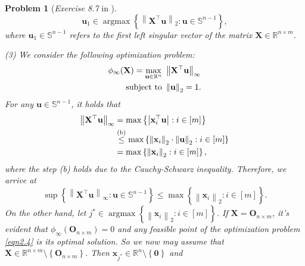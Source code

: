 \documentclass[11pt]{article}
\newtheorem{problem}{Problem}
\DeclareMathOperator*{\argmax}{argmax}
\numberwithin{equation}{problem}
\begin{document}
\begin{problem} [\emph{Exercise 8.7} in \cite{calafiore2014optimization}]
{\begin{equation*}
    \mathbf{u}_1 \in \argmax \left\{ \left\| \mathbf{X}^{\top} \mathbf{u} \right\|_2 : \mathbf{u} \in \mathbb{S}^{n-1} \right\},
\end{equation*}
where $\mathbf{u}_1 \in \mathbb{S}^{n-1}$ refers to the first left singular vector of the matrix $\mathbf{X} \in \mathbb{R}^{n \times m}$.
\medskip

\indent (3) We consider the following optimization problem:
\begin{equation}
    \label{eqn2.4}
    \begin{split}
        \phi_{\infty} (\mathbf{X}) = \max_{\mathbf{u} \in \mathbb{R}^n} \ & \left\| \mathbf{X}^{\top} \mathbf{u} \right\|_{\infty} \\
        \textnormal{subject to }& \left\| \mathbf{u} \right\|_2 = 1.
    \end{split}
\end{equation}
For any $\mathbf{u} \in \mathbb{S}^{n-1}$, it holds that
\begin{equation*}
    \begin{split}
        \left\| \mathbf{X}^{\top} \mathbf{u} \right\|_{\infty}
        &= \max \left\{ \left| \mathbf{x}_{i}^{\top} \mathbf{u} \right| : i \in [m] \right\} \\
        &\stackrel{\textnormal{(b)}}{\leq} \max \left\{ \left\| \mathbf{x}_{i} \right\|_{2} \cdot \left\| \mathbf{u} \right\|_2 : i \in [m] \right\} \\
        &= \max \left\{ \left\| \mathbf{x}_{i} \right\|_{2} : i \in [m] \right\},
    \end{split}
\end{equation*}
where the step (b) holds due to the Cauchy-Schwarz inequality. Therefore, we arrive at
\begin{equation}
    \label{eqn2.5}
    \sup \left\{ \left\| \mathbf{X}^{\top} \mathbf{u} \right\|_{\infty} : \mathbf{u} \in \mathbb{S}^{n-1} \right\} \leq \max \left\{ \left\| \mathbf{x}_{i} \right\|_{2} : i \in [m] \right\}.
\end{equation}
\indent On the other hand, let $j^* \in \argmax \left\{ \left\| \mathbf{x}_i \right\|_2 : i \in [m] \right\}$. If $\mathbf{X} = \mathbf{O}_{n \times m}$, it's evident that $\phi_{\infty} \left( \mathbf{O}_{n \times m} \right) = 0$ and any feasible point of the optimization problem \eqref{eqn2.4} is its optimal solution. So we now may assume that $\mathbf{X} \in \mathbb{R}^{n \times m} \setminus \left\{ \mathbf{O}_{n \times m} \right\}$. Then $\mathbf{x}_{j^*} \in \mathbb{R}^n \setminus \left\{ \mathbf{0} \right\}$ and
}
\end{problem}
\end{document}
